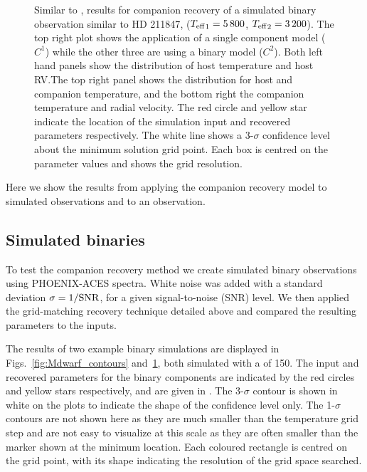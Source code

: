 \begin{figure*}
    \centering
    \caption{Similar to , \textchisquared{} results for companion recovery of a simulated binary observation similar to {HD 211847}, (\({T_{\mathrm{eff}}}_{1} = 5\,800\)\K{}, \({T_{\mathrm{eff}}}_{2}=3\,200\)\K{}). The top right plot shows the application of a single component model (\(C^1\)) while the other three are using a binary model (\(C^2\)). Both left hand panels show the distribution of host temperature and host {RV}.\@ The top right panel shows the distribution for host and companion temperature, and the bottom right the companion temperature and radial velocity.
        The red circle and yellow star indicate the location of the simulation input and recovered parameters respectively.
        The white line shows a 3-\(\sigma\) confidence level about the minimum \textchisquared{} solution grid point. Each box is centred on the parameter values and shows the grid resolution.}
    \label{fig:HD211847_simulated_contours}
\end{figure*}
Here we show the results from applying the companion recovery model to simulated observations and to an observation.


\subsection{Simulated binaries}
\label{subsec:simulated_binaries}
To test the companion recovery method we create simulated binary observations using {PHOENIX-ACES} spectra. White noise was added with a standard deviation \(\rm \sigma = 1/{SNR}\), for a given signal-to-noise ({SNR}) level. We then applied the grid-matching recovery technique detailed above and compared the resulting parameters to the inputs.

The results of two example binary simulations are displayed in Figs.~\ref{fig:Mdwarf_contours} and~\ref{fig:HD211847_simulated_contours}, both simulated with a \snr{} of 150. The input and recovered parameters for the binary components are indicated by the red circles and yellow stars respectively, and are given in .
The 3-\(\sigma\) contour is shown in white on the plots to indicate the shape of the confidence level only. The 1-\(\sigma\) contours are not shown here as they are much smaller than the temperature grid step and are not easy to visualize at this scale as they are often smaller than the marker shown at the minimum location. Each coloured rectangle is centred on the grid point, with its shape indicating the resolution of the grid space searched.

